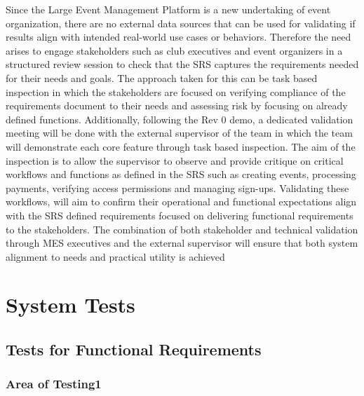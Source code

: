 \documentclass[12pt, titlepage]{article}
\begin{document}
Since the Large Event Management Platform is a new undertaking of event organization, there are no external data sources that can be used for validating if results align with intended real-world use cases or behaviors. Therefore the need arises to engage stakeholders such as club executives and event organizers in a structured review session to check that the SRS captures the requirements needed for their needs and goals. The approach taken for this can be task based inspection in which the stakeholders are focused on verifying compliance of the requirements document to their needs and assessing risk by focusing on already defined functions. Additionally, following the Rev 0 demo, a dedicated validation meeting will be done with the external supervisor of the team in which the team will demonstrate each core feature through task based inspection. The aim of the inspection is to allow the supervisor to observe and provide critique on critical workflows and functions as defined in the SRS such as creating events, processing payments, verifying access permissions and managing sign-ups. Validating these workflows, will aim to confirm their operational and functional expectations align with the SRS defined requirements focused on delivering functional requirements to the stakeholders. The combination of both stakeholder and technical validation through MES executives and the external supervisor will ensure that both system alignment to needs and practical utility is achieved


\section{System Tests}


\subsection{Tests for Functional Requirements}



\subsubsection{Area of Testing1}
\end{document}
